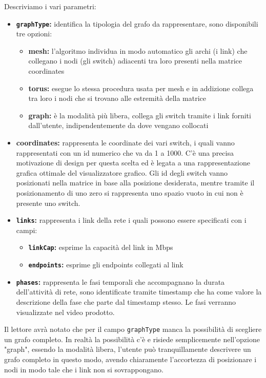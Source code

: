 \documentclass[binding=0.6cm]{sapthesis}
\begin{document}
Descriviamo i vari parametri:
\begin{itemize}
    \item \textbf{\texttt{graphType}:} identifica la tipologia del grafo da rappresentare, sono disponibili tre opzioni:
    \begin{itemize}
        \item \textbf{mesh:} l'algoritmo individua in modo automatico gli archi (i link) che collegano i nodi (gli switch) adiacenti tra loro presenti 
        nella matrice coordinates
        \item \textbf{torus:} esegue lo stessa procedura usata per mesh e in addizione collega tra loro i nodi che si trovano alle estremità della matrice
        \item \textbf{graph:} è la modalità più libera, collega gli switch tramite i link forniti dall'utente, indipendentemente da dove vengano collocati
    \end{itemize}
    \item \textbf{coordinates:} rappresenta le coordinate dei vari switch, 
    i quali vanno rappresentati con un id numerico che va da 1 a 1000. 
    C'è una precisa motivazione di design per questa scelta ed è legata a una rappresentazione 
    grafica ottimale del visualizzatore grafico.
    Gli id degli switch vanno posizionati nella matrice in base alla posizione desiderata, mentre tramite il posizionamento di uno zero si rappresenta uno spazio vuoto in cui non è presente uno switch.
    \item \textbf{\texttt{links}:} rappresenta i link della rete i quali possono essere specificati con i campi:
    \begin{itemize}
        \item \textbf{\texttt{linkCap}:} esprime la capacità del link in Mbps
        \item \textbf{\texttt{endpoints}:} esprime gli endpoints collegati al link
    \end{itemize}
    \item \textbf{\texttt{phases}:} rappresenta le fasi temporali che accompagnano la durata dell'attività di rete, sono identificate tramite timestamp che ha come valore la descrizione della fase che parte dal timestamp stesso. Le fasi verranno visualizzate nel video prodotto.
\end{itemize}
Il lettore avrà notato che per il campo \texttt{graphType} manca la possibilità di scegliere un grafo completo. In realtà la possibilità c'è e risiede semplicemente
nell'opzione "graph", essendo la modalità libera, l'utente può tranquillamente descrivere un grafo completo in questo modo, avendo chiaramente l'accortezza di posizionare i nodi in modo tale che i link non si sovrappongano.
\end{document}
